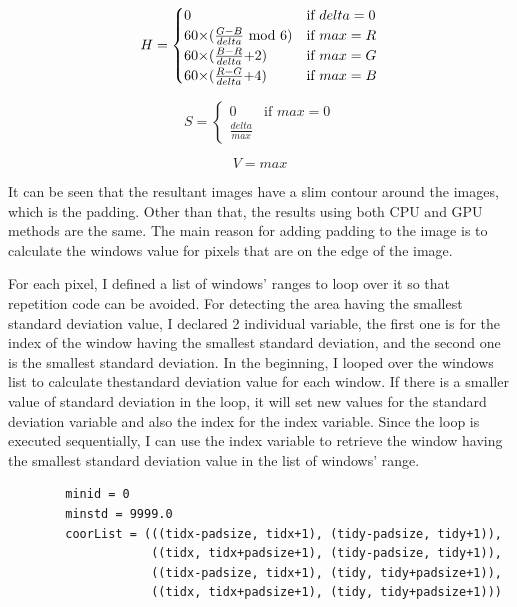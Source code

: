 \documentclass{article}
\begin{document}
\begin{equation*}
  H =
    \begin{cases}
      0 & \text{if }delta = 0\\
      60 $×$ (\frac{G-B}{delta} $ mod $ 6) & \text{if }max = R\\
      60 $×$ (\frac{B-R}{delta} $+$ 2) & \text{if }max = G\\
      60 $×$ (\frac{R-G}{delta} $+$ 4) & \text{if }max = B
    \end{cases}       
\end{equation*}

\begin{equation*}
  S =
    \begin{cases}
      0 & \text{if }max=0\\
      \frac{delta}{max}
    \end{cases}       
\end{equation*}

\begin{equation*}
  V = max
\end{equation*}

It can be seen that the resultant images have a slim contour around the images, which is the padding. Other than that, the results using both CPU and GPU methods are the same. The main reason for adding padding to the image is to calculate the windows value for pixels that are on the edge of the image. 

For each pixel, I defined a list of windows' ranges to loop over it so that repetition code can be avoided. For detecting the area having the smallest standard deviation value, I declared 2 individual variable, the first one is for the index of the window having the smallest standard deviation, and the second one is the smallest standard deviation. In the beginning, I looped over the windows list to calculate thestandard deviation value for each window. If there is a smaller value of standard deviation in the loop, it will set new values for the standard deviation variable and also the index for the index variable. Since the loop is executed sequentially, I can use the index variable to retrieve the window having the smallest standard deviation value in the list of windows' range.

\begin{verbatim}
        minid = 0
        minstd = 9999.0 
        coorList = (((tidx-padsize, tidx+1), (tidy-padsize, tidy+1)),
                    ((tidx, tidx+padsize+1), (tidy-padsize, tidy+1)),
                    ((tidx-padsize, tidx+1), (tidy, tidy+padsize+1)),
                    ((tidx, tidx+padsize+1), (tidy, tidy+padsize+1)))
\end{verbatim}
\end{document}
